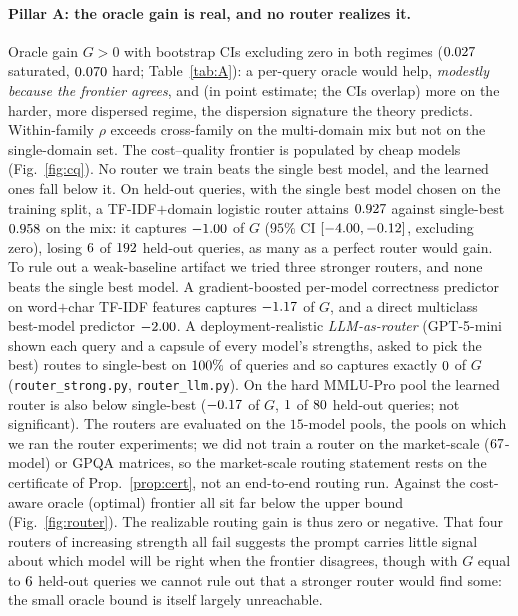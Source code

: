 \documentclass[11pt]{article}
\theoremstyle{plain}
\theoremstyle{definition}
\begin{document}
\paragraph{Pillar A: the oracle gain is real, and no router realizes it.} Oracle gain $G>0$ with bootstrap CIs excluding zero in
both regimes ($0.027$ saturated, $0.070$ hard; Table~\ref{tab:A}): a per-query oracle would help, \emph{modestly because
the frontier agrees}, and
(in point estimate; the CIs overlap) more on the harder, more dispersed regime, the dispersion signature the theory predicts. Within-family $\rho$ exceeds cross-family on
the multi-domain mix but not on the single-domain set. The cost--quality frontier is populated by cheap models
(Fig.~\ref{fig:cq}). No router we train beats the single best model, and the learned ones fall below it. On held-out
queries, with the single best model chosen on the training split, a TF-IDF$+$domain logistic router attains $0.927$
against single-best $0.958$ on the mix: it captures $-1.00$ of $G$ ($95\%$ CI $[-4.00,-0.12]$, excluding
zero), losing $6$ of $192$ held-out queries, as many as a perfect router would gain. To rule out a weak-baseline artifact we tried three stronger
routers, and none beats the single best model. A gradient-boosted per-model correctness predictor on word$+$char TF-IDF features captures
$-1.17$ of $G$, and a direct multiclass best-model predictor $-2.00$. A deployment-realistic \emph{LLM-as-router}
(GPT-5-mini shown each query and a capsule of every model's strengths, asked to pick the best) routes to single-best on
$100\%$ of queries and so captures exactly $0$ of $G$ (\texttt{router\_strong.py},
\texttt{router\_llm.py}). On the hard MMLU-Pro pool the learned router is also below single-best ($-0.17$ of $G$, $1$ of
$80$ held-out queries; not significant).
The routers are evaluated on the $15$-model pools, the pools on which we ran the router experiments; we did not train a router
on the market-scale ($67$-model) or GPQA matrices, so the market-scale routing statement rests on the certificate of
Prop.~\ref{prop:cert}, not an end-to-end
routing run. Against the
cost-aware oracle (optimal) frontier all sit far below the upper bound (Fig.~\ref{fig:router}). The realizable routing gain is thus
zero or negative. That four routers of increasing strength all fail suggests the prompt carries little signal about which
model will be right when the frontier disagrees, though with $G$ equal to $6$ held-out queries we cannot rule out that a
stronger router would find some: the small oracle bound is itself largely unreachable.
\end{document}
